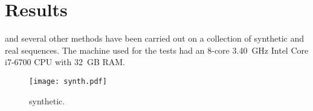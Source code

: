 \clearpage
\section{Results}
\label{sec.results}
\smashpp and several other methods have been carried out on a collection of synthetic and real sequences. The machine used for the tests had an 8-core 3.40~GHz Intel\textsuperscript{\textregistered} Core\texttrademark\xspace i7-6700 CPU with 32~GB RAM.

\begin{figure}[!h]
  \centering
  \texttt{[image: synth.pdf]}
  \caption{synthetic.}
  \label{fig.synth}
\end{figure}